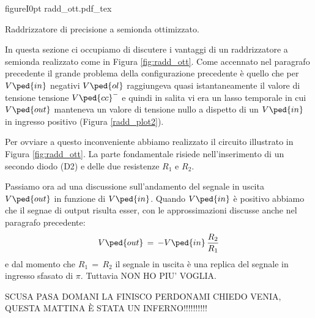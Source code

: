\begin{wrapfloat}{figure}{I}{0pt}
        \def\svgwidth{0.5\textwidth}
        {radd_ott.pdf_tex}
        \caption{Raddrizzatore di precisione a semionda ottimizzato.}
        \label{fig:radd_ott}
\end{wrapfloat}

In questa sezione ci occupiamo di discutere i vantaggi di un raddrizzatore a semionda realizzato come in Figura \ref{fig:radd_ott}. Come accennato nel paragrafo precedente il grande problema della configurazione precedente è quello che per $V\ped{in}$ negativi $V\ped{ol}$ raggiungeva quasi istantaneamente il valore di tensione tensione $V\ped{cc}^-$ e quindi in salita vi era un lasso temporale in cui $V\ped{out}$ manteneva un valore di tensione nullo a dispetto di un $V\ped{in}$ in ingresso positivo (Figura \ref{radd_plot2}).

Per ovviare a questo inconveniente abbiamo realizzato il circuito illustrato in Figura \ref{fig:radd_ott}. La parte fondamentale risiede nell'inserimento di un secondo diodo (D2) e delle due resistenze $R_1$ e $R_2$.

Passiamo ora ad una discussione sull'andamento del segnale in uscita $V\ped{out}$ in funzione di $V\ped{in}$. Quando $V\ped{in}$ è positivo abbiamo che il segnae di output risulta esser, con le approssimazioni discusse anche nel paragrafo precedente:
\begin{equation}
        V\ped{out}\,=\,-V\ped{in}\,\frac{R_2}{R_1}
\end{equation}
e dal momento che $R_1\,=\,R_2$ il segnale in uscita è una replica del segnale in ingresso sfasato di $\pi$.
Tuttavia NON HO PIU' VOGLIA. 

SCUSA PASA DOMANI LA FINISCO PERDONAMI CHIEDO VENIA, QUESTA MATTINA È STATA UN INFERNO!!!!!!!!!!























































